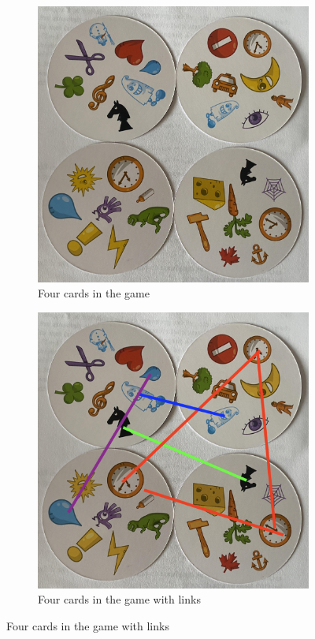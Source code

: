 \documentclass[11pt, oneside]{article} 	%
\begin{document}
\begin{figure}[!htb]
\centering
\begin{subfigure}{.2\textwidth}
 \centering
\includegraphics[scale=.2]{cards}
\caption{Four cards in the game}
\label{fig:cards}
\end{subfigure}

\begin{subfigure}{.2\textwidth}
 \centering
\includegraphics[scale=.2]{cards-graph}
\caption{Four cards in the game with links}
\label{fig:gf-mult}
\end{subfigure}


\end{figure}
\end{document}
